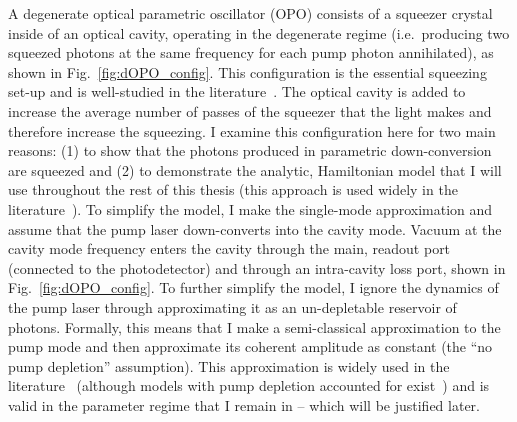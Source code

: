 A degenerate optical parametric oscillator (OPO) consists of a squeezer crystal inside of an optical cavity, operating in the degenerate regime (i.e.\ producing two squeezed photons at the same frequency for each pump photon annihilated), as shown in Fig.~\ref{fig:dOPO_config}. This configuration is the essential squeezing set-up and is well-studied in the literature~\cite{}. The optical cavity is added to increase the average number of passes of the squeezer that the light makes and therefore increase the squeezing. I examine this configuration here for two main reasons: (1) to show that the photons produced in parametric down-conversion are squeezed and (2) to demonstrate the analytic, Hamiltonian model that I will use throughout the rest of this thesis (this approach is used widely in the literature~\cite{}).  
To simplify the model, I make the single-mode approximation and assume that the pump laser down-converts into the cavity mode. Vacuum at the cavity mode frequency enters the cavity through the main, readout port (connected to the photodetector) and through an intra-cavity loss port, shown in Fig.~\ref{fig:dOPO_config}. 
To further simplify the model, I ignore the dynamics of the pump laser through approximating it as an un-depletable reservoir of photons. Formally, this means that I make a semi-classical approximation to the pump mode and then approximate its coherent amplitude as constant (the ``no pump depletion'' assumption). This approximation is widely used in the literature~\cite{} (although models with pump depletion accounted for exist~\cite{}) and is valid in the parameter regime that I remain in -- which will be justified later.

